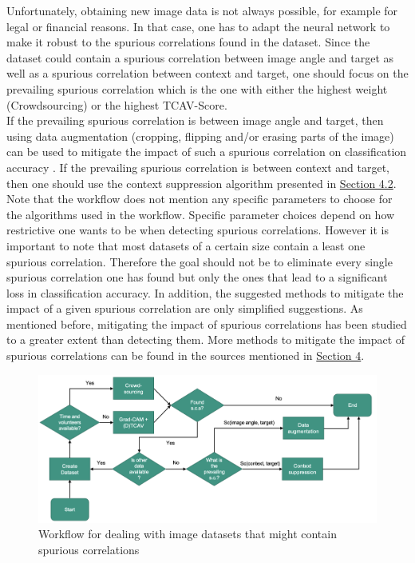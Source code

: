 \documentclass{article}
\begin{document}
Unfortunately, obtaining new image data is not always possible, for example for legal or financial reasons. In that case, one has to adapt the neural network
to make it robust to the spurious correlations found in the dataset. Since the dataset could contain a spurious correlation between image angle and target
as well as a spurious correlation between context and target, one should focus on the prevailing spurious correlation which is the one with either
the highest weight (Crowdsourcing) or the highest TCAV-Score. \\
If the prevailing spurious correlation is between image angle and target, then using data augmentation (cropping, flipping and/or erasing parts of the image)
can be used to mitigate the impact of such a spurious correlation on classification accuracy \cite{Agarwal_2020_CVPR}.
If the prevailing spurious correlation is between context and target, then one should use the context suppression algorithm presented in
\hyperref[sec:contextSuppr]{Section 4.2}. \\
Note that the workflow does not mention any specific parameters to choose for the algorithms used in the workflow. Specific parameter choices depend on how restrictive
one wants to be when detecting spurious correlations. However it is important to note that most datasets of a certain size contain a least one spurious correlation.
Therefore the goal should not be to eliminate every single spurious correlation one has found but only the ones that lead to a significant loss in
classification accuracy. In addition, the suggested methods to mitigate the impact of a given spurious correlation are only simplified suggestions.
As mentioned before, mitigating the impact of spurious correlations has been studied to a greater extent than detecting them. 
More methods to mitigate the impact of spurious correlations can be found in the sources mentioned in \hyperref[sec:mitigatingscs]{Section 4}.

\begin{figure}
    \centering
    \includegraphics[scale=0.42]{sc_workflow.png}
    \caption{Workflow for dealing with image datasets that might contain spurious correlations}
    \label{fig:workflow}
\end{figure}
\end{document}
